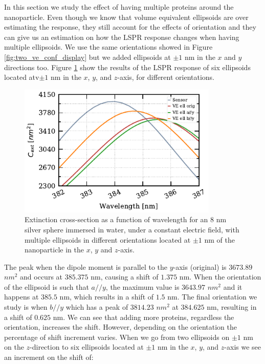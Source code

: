 In this section we study the effect of having multiple proteins around the nanoparticle. Even though we know 
that volume equivalent ellipsoids are over estimating the response, they still account for the effects of 
orientation and they can give us an estimation on how the LSPR response changes when having multiple 
ellipsoids. We use the same orientations showed in Figure \ref{fig:two_ve_conf_display} but we added ellipsoids 
at $\pm 1$ nm in the $x$ and $y$ directions too. Figure \ref{fig:mult_ell} show the results of the LSPR response 
of six ellipsoids located atv$\pm 1$ nm in the $x$, $y$, and $z$-axis, for different orientations. 
 
\begin{figure} %
    \centering
    \includegraphics[width=0.85\textwidth]{six_ve_ell_mult_config.pdf} 
    \caption{Extinction cross-section as a function of wavelength for an $8$ nm
            silver sphere immersed in water, under a constant electric field, with multiple ellipsoids in different orientations 
            located at $\pm 1$ nm of the nanoparticle in the $x$, $y$ and $z$-axis.}
    \label{fig:mult_ell}
 \end{figure}

 The peak when the dipole 
 moment is parallel to the $y$-axis (original) is $3673.89$ $nm^2$ and occurs at $385.375$ nm, causing a shift of 
 $1.375$ nm. When the orientation of the ellipsoid is such that $a//y$, the maximum value is $3643.97$ $nm^2$ and it
 happens at $385.5$ nm, which results in a shift of $1.5$ nm. The final orientation we study is when $b//y$ which 
 has a peak of $3814.23$ $nm^2$ at $384.625$ nm, resulting in a shift of $0.625$ nm. We can see that adding more proteins, 
 regardless the orientation, increases the shift. However, depending on the orientation the percentage of shift increment 
 varies. When we go from two ellipsoids on $\pm 1$ nm on the $z$-direction to six ellipsoids located at 
 $\pm 1$ nm in the $x$, $y$, and $z$-axis we see an increment on the shift of:
 
